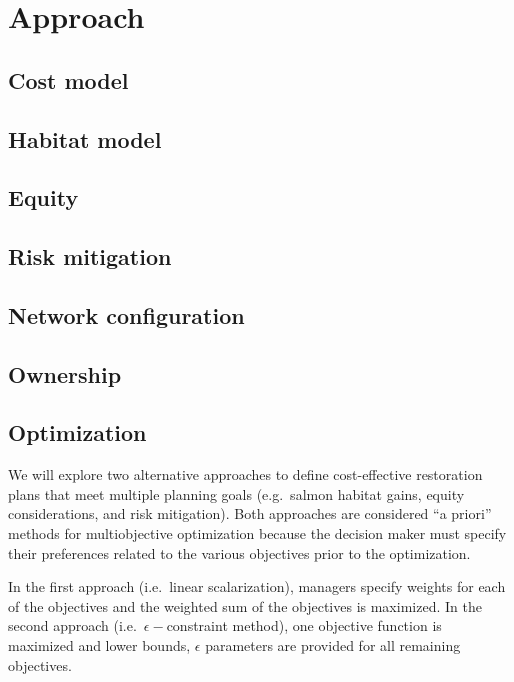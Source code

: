 \documentclass[12pt]{elsarticle}
\begin{document}
%
\section{Approach}
\subsection{Cost model}
\subsection{Habitat model}
\subsection{Equity}
\subsection{Risk mitigation}

\subsection{Network configuration}
\subsection{Ownership}
\subsection{Optimization}

We will explore two alternative approaches to define cost-effective restoration plans that meet multiple planning goals (e.g.\ salmon habitat gains, equity considerations, and risk mitigation). Both approaches are considered ``a priori'' methods for multiobjective optimization because the decision maker must specify their preferences related to the various objectives prior to the optimization. 

In the first approach (i.e.\ linear scalarization), managers specify weights for each of the objectives and the weighted sum of the objectives is maximized. In the second approach (i.e.\ $\epsilon-$constraint method), one objective function is maximized and lower bounds, $\epsilon$ parameters are provided for all remaining objectives.
\end{document}
